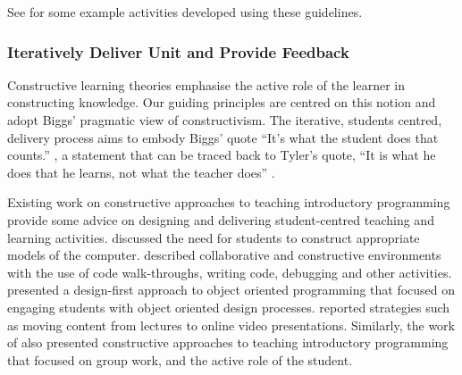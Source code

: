 See  for some example activities developed using these guidelines.



\subsubsection{Iteratively Deliver Unit and Provide Feedback} %
\label{ssub:deliver_unit}

Constructive learning theories emphasise the active role of the learner in constructing knowledge. Our guiding principles are centred on this notion and adopt Biggs' pragmatic view of constructivism. The iterative, students centred, delivery process aims to embody Biggs' quote ``It's what the student does that counts.'' \cite{Biggs:1996c}, a statement that can be traced back to Tyler's quote, ``It is what he does that he learns, not what the teacher does'' \cite{Tyler:1969}.

Existing work on constructive approaches to teaching introductory programming provide some advice on designing and delivering student-centred teaching and learning activities. \citet{BenAri:1998,BenAri:2001} discussed the need for students to construct appropriate models of the computer. \citet{VanGorp:2001} described collaborative and constructive environments with the use of code walk-throughs, writing code, debugging and other activities. \citet{Thramboulidis:2003} presented a design-first approach to object oriented programming that focused on engaging students with object oriented design processes. \citet{Wulf:2005} reported strategies such as moving content from lectures to online video presentations. Similarly, the work of \citet{Thota:2010} also presented constructive approaches to teaching introductory programming that focused on group work, and the active role of the student.

